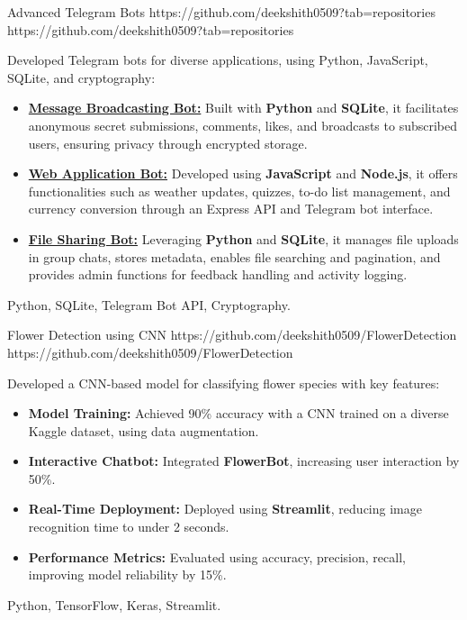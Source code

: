 \documentclass[a4paper,10pt]{article}
\begin{document}
\vspace{10pt}
\projectentry
{Advanced Telegram Bots}
{https://github.com/deekshith0509?tab=repositories}
{https://github.com/deekshith0509?tab=repositories}
{Developed Telegram bots for diverse applications, using Python, JavaScript, SQLite, and cryptography:
\begin{itemize}
\item \textbf{\href{https://github.com/deekshith0509/MessageBroadcasting_Bot}{Message Broadcasting Bot:}} Built with \textbf{Python} and \textbf{SQLite}, it facilitates anonymous secret submissions, comments, likes, and broadcasts to subscribed users, ensuring privacy through encrypted storage.
\item \textbf{\href{https://github.com/deekshith0509/WebApplication_Bot}{Web Application Bot:}} Developed using \textbf{JavaScript} and \textbf{Node.js}, it offers functionalities such as weather updates, quizzes, to-do list management, and currency conversion through an Express API and Telegram bot interface.
\item \textbf{\href{https://github.com/deekshith0509/Fileforwardbot}{File Sharing Bot:}} Leveraging \textbf{Python} and \textbf{SQLite}, it manages file uploads in group chats, stores metadata, enables file searching and pagination, and provides admin functions for feedback handling and activity logging.
\end{itemize}
}{Python, SQLite, Telegram Bot API, Cryptography.}
\vspace{10pt}

\iffalse  %
\projectentry
{Flower Detection using CNN}
{https://github.com/deekshith0509/FlowerDetection}
{https://github.com/deekshith0509/FlowerDetection}
{Developed a CNN-based model for classifying flower species with key features:
\begin{itemize}
\item \textbf{Model Training:} Achieved 90\% accuracy with a CNN trained on a diverse Kaggle dataset, using data augmentation.
    \item \textbf{Interactive Chatbot:} Integrated \textbf{FlowerBot}, increasing user interaction by 50\%.
    \item \textbf{Real-Time Deployment:} Deployed using \textbf{Streamlit}, reducing image recognition time to under 2 seconds.
    \item \textbf{Performance Metrics:} Evaluated using accuracy, precision, recall, improving model reliability by 15\%.
\end{itemize}
}
{Python, TensorFlow, Keras, Streamlit.}
\end{document}
